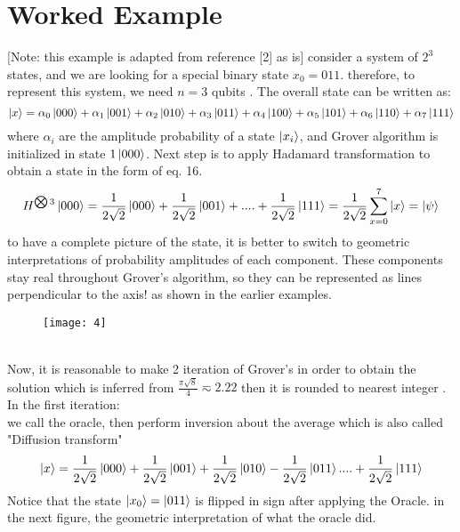 \documentclass[11pt]{article}
\begin{document}
\section{Worked Example}
[Note: this example is adapted from reference [2] as is]
consider a system of $2^{3}$ states, and we are looking for a special binary state $x_0 = 011$. therefore, to represent this system, we need $n = 3$ qubits . The overall state can be written as:
\begin{equation}
\ket{x} = \alpha_0 \ket{000} + \alpha_1 \ket{001} + \alpha_2 \ket{010} + \alpha_3 \ket{011} + \alpha_4 \ket{100} + \alpha_5 \ket{101} + \alpha_6 \ket{110} + \alpha_7 \ket{111} 
\end{equation} 
where $\alpha_i$ are the amplitude probability of a state $\ket{x_i}$, and Grover algorithm is initialized in state $1\ket{000}$.
Next step is to apply Hadamard transformation to obtain a state in the form of eq. 16. 
\begin{equation}
	H^{\bigotimes3}\ket{000} = \frac{1}{2\sqrt{2}}\ket{000} + \frac{1}{2\sqrt{2}} \ket{001}+....+ \frac{1}{2\sqrt{2}} \ket{111}
	= \frac{1}{2\sqrt{2}}\sum_{x=0}^{7}\ket{x} = \ket{\psi} 
\end{equation}
to have a complete picture of the state, it is better to switch to geometric interpretations of probability amplitudes of each component. These components stay real throughout Grover's algorithm, so they can be represented as lines perpendicular to the axis! as shown in the earlier examples. 
\begin{figure}[h!]
	\texttt{[image: 4]}
	\centering
\end{figure} \\
Now, it is reasonable to make 2 iteration of Grover's in order to obtain the solution which is inferred from $\frac{\pi \sqrt{8}}{4} \eqsim 2.22$ then it is rounded to nearest integer \cite{strubell2011}. \\
In the first iteration:\\
we call the oracle, then perform inversion about the average which is also called "Diffusion transform"\\
\begin{equation}
\ket{x} = \frac{1}{2\sqrt{2}}\ket{000} + \frac{1}{2\sqrt{2}} \ket{001}+ \frac{1}{2\sqrt{2}} \ket{010} - \frac{1}{2\sqrt{2}} \ket{011}....+ \frac{1}{2\sqrt{2}} \ket{111}
\end{equation} 
Notice that the state $\ket{x_0} = \ket{011}$ is flipped in sign after applying the Oracle. in the next figure, the geometric interpretation of what the oracle did. 
\end{document}
